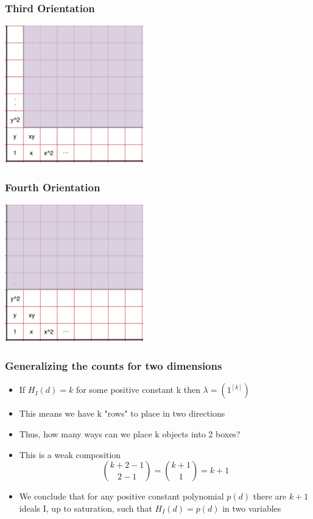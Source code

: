 \documentclass{beamer}
\begin{document}
\begin{frame}
	\frametitle{Third Orientation}
	\begin{center}
	\includegraphics[width=6cm, height=6cm]{LogMMidtermPresentationImages/hpis3thirdorientation.png}
	\end{center}
\end{frame}


\begin{frame}
	\frametitle{Fourth Orientation}
	\begin{center}
	\includegraphics[width=6cm, height=6cm]{LogMMidtermPresentationImages/hpis3fourthorientation.png}
	\end{center}
\end{frame}

\begin{frame}
	\frametitle{Generalizing the counts for two dimensions}
	\begin{itemize}
	\item If $H_I(d)= k$ for some positive constant k then $\lambda = {(1^{[k]})}$
	\item This means we have k "rows" to place in two directions
	\item Thus, how many ways can we place k objects into 2 boxes?
	\item This is a weak composition
	\[\binom{k+2-1}{2-1}= \binom{k+1}{1} = k+1\]
	\item We conclude that for any positive constant polynomial $p(d)$  there are $k+1$ ideals I, up to saturation, such that $H_I(d)= p(d)$ in two variables{}
	\end{itemize}
\end{frame}
\end{document}
